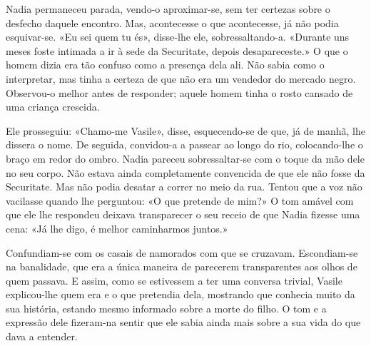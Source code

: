 Nadia permaneceu parada, vendo-o aproximar-se, sem ter certezas sobre o
desfecho daquele encontro. Mas, acontecesse o que acontecesse, já não
podia esquivar-se. «Eu sei quem tu és», disse-lhe ele, sobressaltando-a.
«Durante uns meses foste intimada a ir à sede da Securitate, depois
desapareceste.» O que o homem dizia era tão confuso como a presença
dela ali. Não sabia como o interpretar, mas tinha a certeza de que não
era um vendedor do mercado negro. Observou-o melhor antes de responder;
aquele homem tinha o rosto cansado de uma criança crescida.

Ele prosseguiu: «Chamo-me Vasile», disse, esquecendo-se de que, já de manhã, lhe dissera o nome. De seguida, convidou-a a
passear ao longo do rio, colocando-lhe o braço em redor do ombro. Nadia
pareceu sobressaltar-se com o toque da mão dele no seu corpo. Não estava
ainda completamente convencida de que ele não fosse da Securitate. Mas
não podia desatar a correr no meio da rua. Tentou que a voz não
vacilasse quando lhe perguntou: «O que pretende de mim?» O tom amável
com que ele lhe respondeu deixava transparecer o seu receio de que
Nadia fizesse uma cena: «Já lhe digo, é melhor caminharmos juntos.»

Confundiam-se com os casais de namorados com que se cruzavam.
Escondiam-se na banalidade, que era a única maneira de parecerem
transparentes aos olhos de quem passava. E assim, como se estivessem a
ter uma conversa trivial, Vasile explicou-lhe quem era e o que pretendia
dela, mostrando que conhecia muito da sua história, estando mesmo
informado sobre a morte do filho. O tom e a expressão dele fizeram-na
sentir que ele sabia ainda mais sobre a sua vida do que dava a entender.


